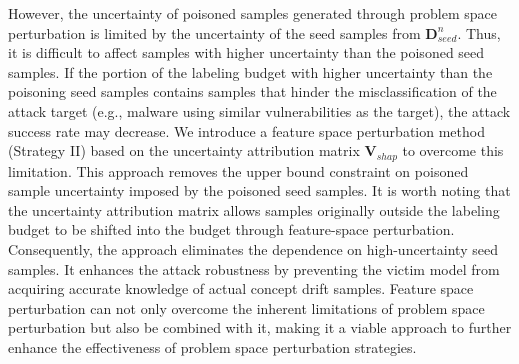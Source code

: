 \documentclass[conference,compsoc]{IEEEtran} %
\begin{document}
However, the uncertainty of poisoned samples generated through problem space perturbation is limited by the uncertainty of the seed samples from $\bm{D}_{seed}^{n}$.
Thus, it is difficult to affect samples with higher uncertainty than the poisoned seed samples.
If the portion of the labeling budget with higher uncertainty than the poisoning seed samples contains samples that hinder the misclassification of the attack target (e.g., malware using similar vulnerabilities as the target), the attack success rate may decrease.
We introduce a feature space perturbation method (Strategy II) based on the uncertainty attribution matrix $\bm{V}_{shap}$ to overcome this limitation.
This approach removes the upper bound constraint on poisoned sample uncertainty imposed by the poisoned seed samples.
It is worth noting that the uncertainty attribution matrix allows samples originally outside the labeling budget to be shifted into the budget through feature-space perturbation.
Consequently, the approach eliminates the dependence on high-uncertainty seed samples.
It enhances the attack  robustness by preventing the victim model from acquiring accurate knowledge of actual concept drift samples.
Feature space perturbation can not only overcome the inherent limitations of problem space perturbation but also be combined with it, making it a viable approach to further enhance the effectiveness of problem space perturbation strategies.
\end{document}
